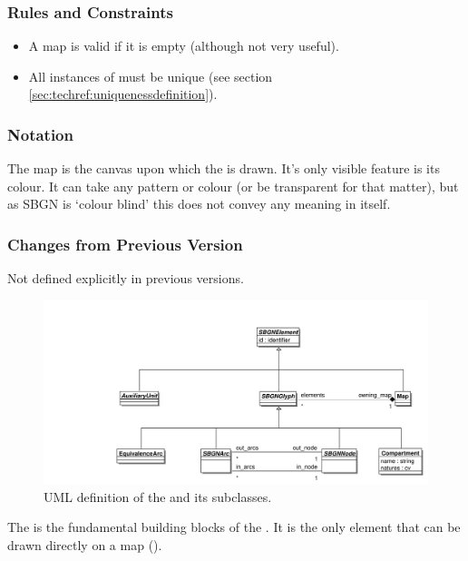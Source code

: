 \subsubsection{Rules and Constraints}

\begin{itemize}
\item A map is valid if it is empty (although not very useful).
\item All instances of  must be unique (see
  section \ref{sec:techref:uniquenessdefinition}).
\end{itemize}

\subsubsection{Notation}

The map is the canvas upon which the \PDl is drawn. It's only visible
feature is its colour. It can take any pattern or colour (or be
transparent for that matter), but as SBGN is `colour blind' this does
not convey any meaning in itself.

\subsubsection{Changes from Previous Version}

Not defined explicitly in previous versions.

\label{defn:SBGNGlyph}

\begin{figure}[htb]
  \centering
  \includegraphics[width=\textwidth]{images/glyphauxuml}
\caption{UML definition of the  and its subclasses.}
  \label{fig:techref:glyphauxuml}
\end{figure}

The  is the fundamental building blocks of the
\PDl. It is the only element that can be drawn directly on a map
().


